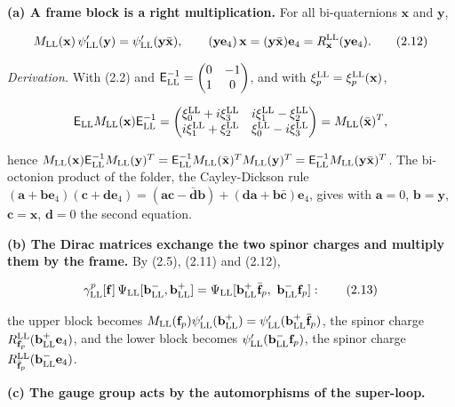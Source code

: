 \documentclass[
  10pt,
]{article}
\begin{document}
\textbf{(a) A frame block is a right multiplication.} For all
bi-quaternions \(\mathbf x\) and \(\mathbf y\),

\[M_{\rm LL}(\mathbf x)\,\psi'_{\rm LL}(\mathbf y)=\psi'_{\rm LL}(\mathbf y\bar{\mathbf x}),\qquad(\mathbf y\mathbf e_4)\,\mathbf x=(\mathbf y\bar{\mathbf x})\mathbf e_4=R^{\rm LL}_{\mathbf x}(\mathbf y\mathbf e_4).\tag{2.12}\]

\emph{Derivation.} With (2.2) and
\(\mathsf E_{\rm LL}^{-1}=\begin{pmatrix}0&-1\\1&0\end{pmatrix}\), and
with \(\xi^{\rm LL}_p=\xi^{\rm LL}_p(\mathbf x)\),

\[\mathsf E_{\rm LL}M_{\rm LL}(\mathbf x)\mathsf E_{\rm LL}^{-1}=\begin{pmatrix}\xi^{\rm LL}_0+i\xi^{\rm LL}_3&i\xi^{\rm LL}_1-\xi^{\rm LL}_2\\i\xi^{\rm LL}_1+\xi^{\rm LL}_2&\xi^{\rm LL}_0-i\xi^{\rm LL}_3\end{pmatrix}=M_{\rm LL}(\bar{\mathbf x})^T,\]

hence
\(M_{\rm LL}(\mathbf x)\mathsf E_{\rm LL}^{-1}M_{\rm LL}(\mathbf y)^T=\mathsf E_{\rm LL}^{-1}M_{\rm LL}(\bar{\mathbf x})^TM_{\rm LL}(\mathbf y)^T=\mathsf E_{\rm LL}^{-1}M_{\rm LL}(\mathbf y\bar{\mathbf x})^T\).
The bi-octonion product of the folder, the Cayley-Dickson rule
\((\mathbf a+\mathbf b\mathbf e_4)(\mathbf c+\mathbf d\mathbf e_4)=(\mathbf a\mathbf c-\bar{\mathbf d}\mathbf b)+(\mathbf d\mathbf a+\mathbf b\bar{\mathbf c})\mathbf e_4\),
gives with \(\mathbf a=0\), \(\mathbf b=\mathbf y\),
\(\mathbf c=\mathbf x\), \(\mathbf d=0\) the second equation.

\textbf{(b) The Dirac matrices exchange the two spinor charges and
multiply them by the frame.} By (2.5), (2.11) and (2.12),

\[\gamma^p_{\rm LL}[\mathbf f]\,\Psi_{\rm LL}[\mathbf b^-_{\rm LL},\mathbf b^+_{\rm LL}]=\Psi_{\rm LL}[\mathbf b^+_{\rm LL}\bar{\mathbf f}_p,\ \mathbf b^-_{\rm LL}\mathbf f_p]:\tag{2.13}\]

the upper block becomes
\(M_{\rm LL}(\mathbf f_p)\psi'_{\rm LL}(\mathbf b^+_{\rm LL})=\psi'_{\rm LL}(\mathbf b^+_{\rm LL}\bar{\mathbf f}_p)\),
the spinor charge
\(R^{\rm LL}_{\mathbf f_p}(\mathbf b^+_{\rm LL}\mathbf e_4)\), and the
lower block becomes \(\psi'_{\rm LL}(\mathbf b^-_{\rm LL}\mathbf f_p)\),
the spinor charge
\(R^{\rm LL}_{\bar{\mathbf f}_p}(\mathbf b^-_{\rm LL}\mathbf e_4)\).

\textbf{(c) The gauge group acts by the automorphisms of the
super-loop.}
\end{document}
